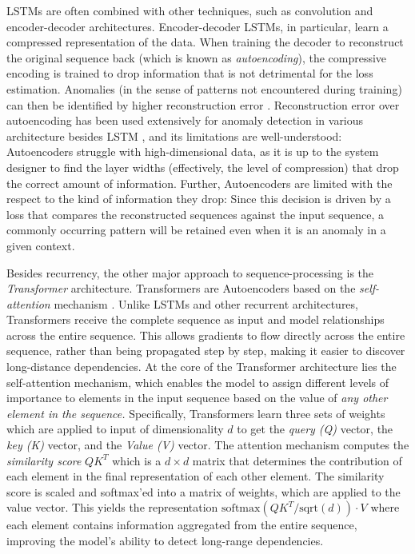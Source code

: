 \documentclass[runningheads]{llncs}
\begin{document}
LSTMs are often combined with other techniques, such as convolution
and encoder-decoder architectures. Encoder-decoder LSTMs, in
particular, learn a compressed representation of the data. When
training the decoder to reconstruct the original sequence back
(which is known as \emph{autoencoding}), the compressive encoding is
trained to drop information that is not detrimental for the loss
estimation. Anomalies (in the sense of patterns not encountered during
training) can then be identified by higher reconstruction error
\cite{SGUEGLIA2022170,aerospace6110117}.
Reconstruction error over autoencoding has been used extensively for
anomaly detection in various architecture besides LSTM
\cite{10.1145/3691338}, and its limitations are well-understood:
Autoencoders struggle with high-dimensional data, as it is up to the
system designer to find the layer widths (effectively, the level of
compression) that drop the correct amount of information.
Further, Autoencoders are limited with the respect to the kind of
information they drop: Since this decision is driven by a loss that
compares the reconstructed sequences against the input sequence, a
commonly occurring pattern will be retained even when it is an anomaly
in a given context.

Besides recurrency, the other major approach to sequence-processing is
the \emph{Transformer} architecture. Transformers are Autoencoders
based on the \emph{self-attention} mechanism \cite{vaswani-etal:2017}.
Unlike LSTMs and other recurrent architectures, Transformers receive
the complete sequence as input and model relationships across the
entire sequence. This allows gradients to flow directly across the
entire sequence, rather than being propagated step by step, making it
easier to discover long-distance dependencies.
%
At the core of the Transformer architecture lies the self-attention
mechanism, which enables the model to assign different levels of
importance to elements in the input sequence
based on the value of \emph{any other element in the sequence.}
Specifically, Transformers learn three sets of weights which are
applied to input of dimensionality $d$ to get the
\emph{query (Q)} vector, the \emph{key (K)} vector,
and the \emph{Value (V)} vector.
The attention mechanism computes the \emph{similarity score} $QK^T$
which is a $d \times d$ matrix that determines the contribution of each
element in the final representation of each other element. The
similarity score is scaled and softmax'ed into a matrix of weights,
which are applied to the value vector. This yields the representation
%
$\mathrm{softmax}\left(QK^T / \mathrm{sqrt}(d)\right)\cdot V$
%
where each element contains information aggregated from the entire
sequence, improving the model's ability to detect long-range dependencies.
\end{document}
